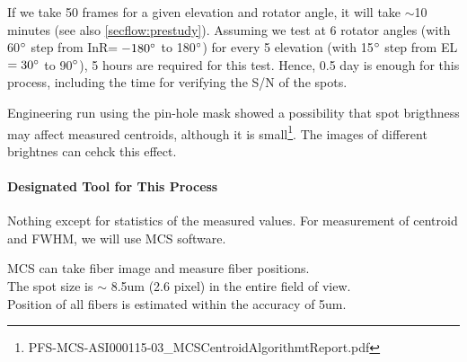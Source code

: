 If we take 50 frames for a given elevation and rotator angle, it will take $\sim$10 minutes (see also \ref{secflow:prestudy}).
Assuming we test at 6 rotator angles (with 60$^\circ$ step from InR$=-180^\circ$ to 180$^\circ$) for every 5 elevation (with 15$^\circ$ step from EL$=30^\circ$ to 90$^\circ$), 5 hours are required for this test.
Hence, 0.5 day is enough for this process, including the time for verifying the S/N of the spots.

Engineering run using the pin-hole mask showed a possibility that spot brigthness may affect measured centroids, although it is small\footnote{PFS-MCS-ASI000115-03\_MCSCentroidAlgorithmtReport.pdf}.
The images of different brightnes can cehck this effect.


\paragraph{Designated Tool for This Process}
Nothing except for statistics of the measured values.
For measurement of centroid and FWHM, we will use MCS software.


\begin{itembox}[l]{}
MCS can take fiber image and measure fiber positions. \\
The spot size is $\sim$ 8.5um (2.6 pixel) in the entire field of view. \\
Position of all fibers is estimated within the accuracy of 5um.

\end{itembox}